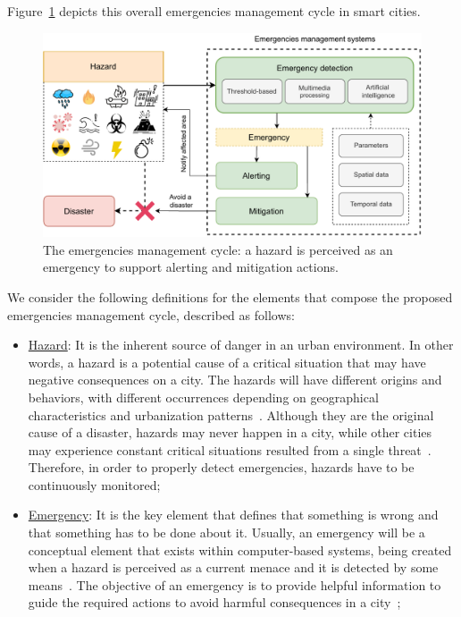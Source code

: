 \begin{refsection}
Figure~\ref{Fig:cycle} depicts this overall emergencies management cycle in smart cities. 

\begin{figure}[htbp]
  \centering
  \includegraphics[scale=0.85]{Chapters/1-Survey/images/newcycle.pdf}
  \caption{The emergencies management cycle: a hazard is perceived as an emergency to support alerting and mitigation actions.}\label{Fig:cycle}
\end{figure}

We consider the following definitions for the elements that compose the proposed emergencies management cycle, described as follows:

\begin{itemize}
  \item \underline{Hazard}: It is the inherent source of danger in an urban environment. In other words, a hazard is a potential cause of a critical situation that may have negative consequences on a city. The hazards will have different origins and behaviors, with different occurrences depending on geographical characteristics and urbanization patterns~\cite{hazard1,hazard2}. Although they are the original cause of a disaster, hazards may never happen in a city, while other cities may experience constant critical situations resulted from a single threat~\cite{hazard3}. Therefore, in order to properly detect emergencies, hazards have to be continuously monitored;
  
  \item \underline{Emergency}: It is the key element that defines that something is wrong and that something has to be done about it. Usually, an emergency will be a conceptual element that exists within computer-based systems, being created when a hazard is perceived as a current menace and it is detected by some means~\cite{socialmedia1,citiesdisasters1}. The objective of an emergency is to provide helpful information to guide the required actions to avoid harmful consequences in a city~\cite{emergenciesgeneral1};
  

\end{itemize}
\end{refsection}
